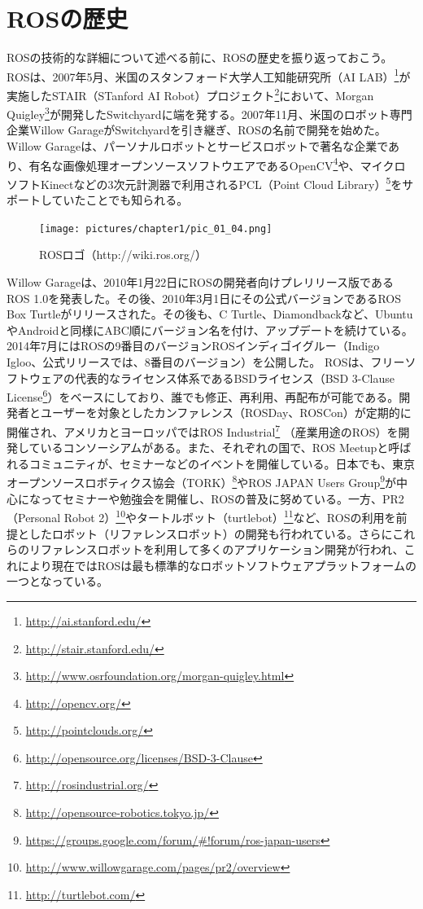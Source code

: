 \section{ROSの歴史}

ROSの技術的な詳細について述べる前に、ROSの歴史を振り返っておこう。 ROSは、2007年5月、米国のスタンフォード大学人工知能研究所（AI LAB）\footnote{\url{http://ai.stanford.edu/}}が実施したSTAIR（STanford AI Robot）プロジェクト\footnote{\url{http://stair.stanford.edu/}}において、Morgan Quigley\footnote{\url{http://www.osrfoundation.org/morgan-quigley.html}}が開発したSwitchyardに端を発する。2007年11月、米国のロボット専門企業Willow GarageがSwitchyardを引き継ぎ、ROSの名前で開発を始めた。Willow Garageは、パーソナルロボットとサービスロボットで著名な企業であり、有名な画像処理オープンソースソフトウエアであるOpenCV\footnote{\url{http://opencv.org/}}や、マイクロソフトKinectなどの3次元計測器で利用されるPCL（Point Cloud Library）\footnote{\url{http://pointclouds.org/}}をサポートしていたことでも知られる。

\begin{figure}[h]
  \centering
  \texttt{[image: pictures/chapter1/pic\_01\_04.png]}
  \caption{ROSロゴ（http://wiki.ros.org/）}
\end{figure}

Willow Garageは、2010年1月22日にROSの開発者向けプレリリース版であるROS 1.0を発表した。その後、2010年3月1日にその公式バージョンであるROS Box Turtleがリリースされた。その後も、C Turtle、Diamondbackなど、UbuntuやAndroidと同様にABC順にバージョン名を付け、アップデートを続けている。 2014年7月にはROSの9番目のバージョンROSインディゴイグルー（Indigo Igloo、公式リリースでは、8番目のバージョン）を公開した。
ROSは、フリーソフトウェアの代表的なライセンス体系であるBSDライセンス（BSD 3-Clause License\footnote{\url{http://opensource.org/licenses/BSD-3-Clause}}）をベースにしており、誰でも修正、再利用、再配布が可能である。開発者とユーザーを対象としたカンファレンス（ROSDay、ROSCon）が定期的に開催され、アメリカとヨーロッパではROS Industrial\footnote{\url{http://rosindustrial.org/}} （産業用途のROS）を開発しているコンソーシアムがある。また、それぞれの国で、ROS Meetupと呼ばれるコミュニティが、セミナーなどのイベントを開催している。日本でも、東京オープンソースロボティクス協会（TORK）\footnote{\url{http://opensource-robotics.tokyo.jp/}}やROS JAPAN Users Group\footnote{\url{https://groups.google.com/forum/#!forum/ros-japan-users}}が中心になってセミナーや勉強会を開催し、ROSの普及に努めている。一方、PR2（Personal Robot 2）\footnote{\url{http://www.willowgarage.com/pages/pr2/overview}}やタートルボット（turtlebot）\footnote{\url{http://turtlebot.com/}}など、ROSの利用を前提としたロボット（リファレンスロボット）の開発も行われている。さらにこれらのリファレンスロボットを利用して多くのアプリケーション開発が行われ、これにより現在ではROSは最も標準的なロボットソフトウェアプラットフォームの一つとなっている。


